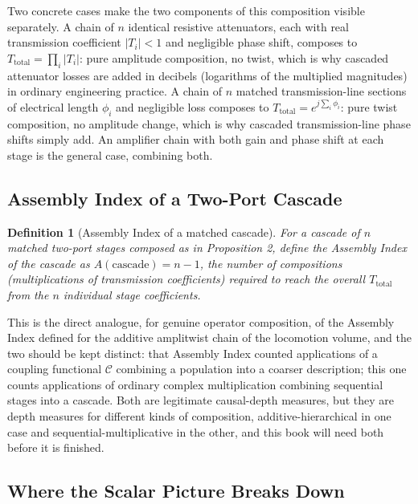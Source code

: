 \documentclass[12pt]{article}
\newtheorem{definition}{Definition}
\begin{document}
Two concrete cases make the two components of this composition visible separately. A chain of $n$ identical resistive attenuators, each with real transmission coefficient $|T_i| < 1$ and negligible phase shift, composes to $T_{\text{total}} = \prod_i |T_i|$: pure amplitude composition, no twist, which is why cascaded attenuator losses are added in decibels (logarithms of the multiplied magnitudes) in ordinary engineering practice. A chain of $n$ matched transmission-line sections of electrical length $\phi_i$ and negligible loss composes to $T_{\text{total}} = e^{j\sum_i \phi_i}$: pure twist composition, no amplitude change, which is why cascaded transmission-line phase shifts simply add. An amplifier chain with both gain and phase shift at each stage is the general case, combining both.

\subsection{Assembly Index of a Two-Port Cascade}

\begin{definition}[Assembly Index of a matched cascade]
For a cascade of $n$ matched two-port stages composed as in Proposition 2, define the Assembly Index of the cascade as $A(\text{cascade}) = n - 1$, the number of compositions (multiplications of transmission coefficients) required to reach the overall $T_{\text{total}}$ from the $n$ individual stage coefficients.
\end{definition}

This is the direct analogue, for genuine operator composition, of the Assembly Index defined for the additive amplitwist chain of the locomotion volume, and the two should be kept distinct: that Assembly Index counted applications of a coupling functional $\mathcal{C}$ combining a population into a coarser description; this one counts applications of ordinary complex multiplication combining sequential stages into a cascade. Both are legitimate causal-depth measures, but they are depth measures for different kinds of composition, additive-hierarchical in one case and sequential-multiplicative in the other, and this book will need both before it is finished.

\subsection{Where the Scalar Picture Breaks Down}
\end{document}
